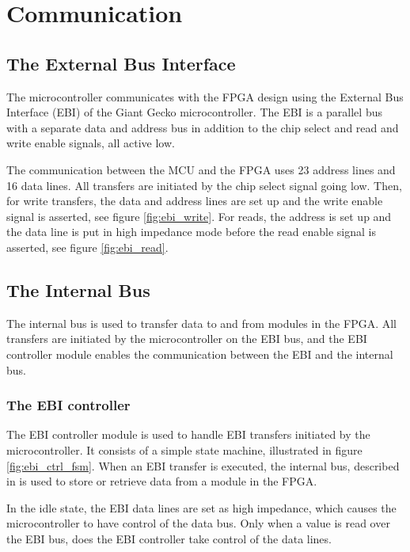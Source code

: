 \FloatBarrier
\section{Communication}

\subsection{The External Bus Interface}
The microcontroller communicates with the FPGA design using the External Bus
Interface (EBI) of the Giant Gecko microcontroller. The EBI is a parallel bus
with a separate data and address bus in addition to the chip select and read and
write enable signals, all active low\cite{efm_ebi}.

The communication between the MCU and the FPGA uses 23 address lines and 16
data lines. All transfers are initiated by the chip select signal going low.
Then, for write transfers, the data and address lines are set up and the
write enable signal is asserted, see figure \ref{fig:ebi_write}. For reads,
the address is set up and the data line is put in high impedance mode before
the read enable signal is asserted, see figure \ref{fig:ebi_read}.




\FloatBarrier
\subsection{The Internal Bus}

The internal bus is used to transfer data to and from modules in the FPGA.
All transfers are initiated by the microcontroller on the EBI bus, and the
EBI controller module enables the communication between the EBI and the 
internal bus.

\subsubsection{The EBI controller}
The EBI controller module is used to handle EBI transfers initiated by the
microcontroller. It consists of a simple state machine, illustrated in
figure \ref{fig:ebi_ctrl_fsm}. When an EBI transfer is executed, the
internal bus, described in is used to store or retrieve data from a module
in the FPGA.

In the idle state, the EBI data lines are set as high impedance, which
causes the microcontroller to have control of the data bus. Only when
a value is read over the EBI bus, does the EBI controller take control of
the data lines.

